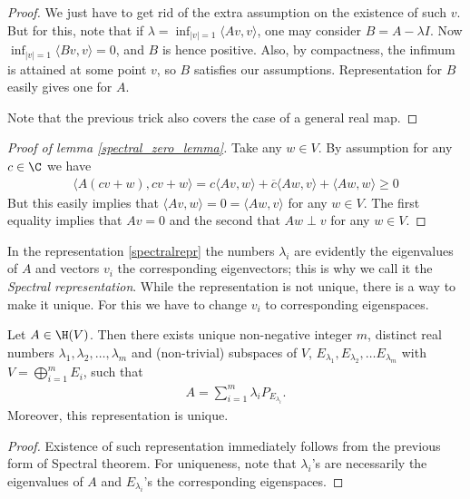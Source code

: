 \begin{proof}
	We just have to get rid of the extra assumption on the existence of such $v$. But for this, note that if $\lambda = \inf_{|v| = 1} \langle A v, v \rangle$, one may consider $B = A - \lambda I$. Now $\inf_{|v| = 1} \langle B v, v \rangle = 0$, and $B$ is hence positive. Also, by compactness, the infimum is attained at some point $v$, so $B$ satisfies our assumptions. Representation for $B$ easily gives one for $A$.

	Note that the previous trick also covers the case of a general real map.
\end{proof}

\begin{proof}[Proof of lemma \ref{spectral_zero_lemma}]
	Take any $w \in V$. By assumption for any $c \in \C$ we have
	\begin{align*}
		\langle A (c v + w), c v + w \rangle = c \langle A v, w \rangle + \overline{c} \langle A w, v \rangle + \langle A w, w \rangle \geq 0
	\end{align*}
	But this easily implies that $\langle A v, w \rangle = 0 = \langle A w, v \rangle$ for any $w \in V$. The first equality implies that $A v = 0$ and the second that $A w \perp v$ for any $w \in V$.
\end{proof}

In the representation \ref{spectralrepr} the numbers $\lambda_{i}$ are evidently the eigenvalues of $A$ and vectors $v_{i}$ the corresponding eigenvectors; this is why we call it the \textit{Spectral representation}. While the representation is not unique, there is a way to make it unique. For this we have to change $v_{i}$ to corresponding eigenspaces.

\begin{lause}
	Let $A \in \H(V)$. Then there exists unique non-negative integer $m$, distinct real numbers $\lambda_{1}, \lambda_{2}, \ldots, \lambda_{m}$ and (non-trivial) subspaces of $V$, $E_{\lambda_{1}}, E_{\lambda_{2}}, \ldots E_{\lambda_{m}}$ with $V = \bigoplus_{i = 1}^{m} E_{i}$, such that
	\begin{align}\label{spectralrepr2}
		A = \sum_{i = 1}^{m} \lambda_{i} P_{E_{\lambda_{i}}}.
	\end{align}
	Moreover, this representation is unique.
\end{lause}
\begin{proof}
	Existence of such representation immediately follows from the previous form of Spectral theorem. For uniqueness, note that $\lambda_{i}$'s are necessarily the eigenvalues of $A$ and $E_{\lambda_{i}}$'s the corresponding eigenspaces.
\end{proof}

